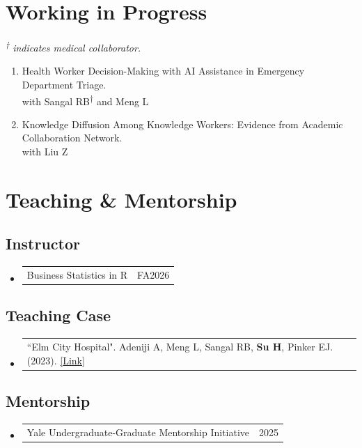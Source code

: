 \documentclass[letterpaper,11pt]{article}
\makeatletter
\newlength{\cvrowwidth}\setlength{\cvrowwidth}{0.97\textwidth}
\newcommand{\resumeProjectHeading}[2]{
    \item
    \begin{tabularx}{\cvrowwidth}{@{}>{\raggedright\arraybackslash\small}X@{\hspace{1em}}r@{}}
      #1 & #2 \\
    \end{tabularx}\vspace{-7pt}
}
\newcommand{\resumeSubHeadingListStart}{\setlength{\cvrowwidth}{0.97\textwidth}\begin{itemize}[leftmargin=0.15in, label={}]}
\newcommand{\resumeSubHeadingListEnd}{\end{itemize}}
\makeatother
\begin{document}
\section{Working in Progress}
\begin{flushleft}
\vspace{-5pt}
\textit{\textsuperscript{†} indicates medical collaborator.}
\end{flushleft}
\vspace{-20pt}

\begin{enumerate}[leftmargin=*]
\item Health Worker Decision-Making with AI Assistance in Emergency Department Triage. \\with Sangal RB\textsuperscript{†} and Meng L
    \vspace{-4pt}
\item Knowledge Diffusion Among Knowledge Workers: Evidence from Academic Collaboration Network. \\with Liu Z
\end{enumerate}

\section{Teaching \& Mentorship}
\subsection*{Instructor}
\resumeSubHeadingListStart
        \resumeProjectHeading
        {Business Statistics in R}{FA2026}
\resumeSubHeadingListEnd

\subsection*{Teaching Case}
\resumeSubHeadingListStart
\resumeProjectHeading{{``Elm City Hospital".}
    Adeniji A, Meng L, Sangal RB, \textbf{Su H}, Pinker EJ. (2023). \href{https://cases.som.yale.edu/elm-city-hospital/access}{\textcolor{linkblue}{[Link]}}}{}
\resumeSubHeadingListEnd

\subsection*{Mentorship}
\resumeSubHeadingListStart
\resumeProjectHeading{Yale Undergraduate-Graduate Mentorship Initiative}{2025}
\resumeSubHeadingListEnd
\end{document}
